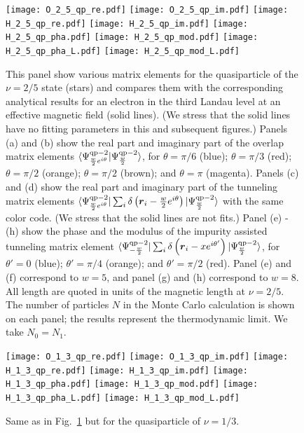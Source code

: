 \documentclass[twocolumn,floatfix,prb,aps,showpacs]{revtex4-2}
\renewcommand{\vec}[1]{\mbox{\boldmath$#1$}}
\begin{document}
\begin{figure}[t]
	\texttt{[image: O\_2\_5\_qp\_re.pdf]} 
	\texttt{[image: O\_2\_5\_qp\_im.pdf]} 
    \texttt{[image: H\_2\_5\_qp\_re.pdf]} 
	\texttt{[image: H\_2\_5\_qp\_im.pdf]} 
    \texttt{[image: H\_2\_5\_qp\_pha.pdf]} 
	\texttt{[image: H\_2\_5\_qp\_mod.pdf]} 
   \texttt{[image: H\_2\_5\_qp\_pha\_L.pdf]} 
	\texttt{[image: H\_2\_5\_qp\_mod\_L.pdf]} 
	\caption{This panel show various matrix elements for the quasiparticle of the 
	$\nu=2/5$ state (stars) and compares them with the corresponding analytical results for an electron in the third Landau level at an effective magnetic field (solid lines). (We stress that the solid lines have no fitting parameters in this and subsequent figures.) Panels (a) and (b) show the real part and imaginary part of the overlap matrix elements $\langle \Psi^{{\rm qp}-2}_{{w\over 2}e^{i\theta}}|\Psi^{{\rm qp}-2}_{w\over 2}\rangle$, for $\theta=\pi/6$ (blue); $\theta=\pi/3$ (red); $\theta=\pi/2$ (orange); $\theta=\pi/2$ (brown); and $\theta=\pi$ (magenta).  Panels (c) and (d) show the real part and imaginary part of the tunneling matrix elements $\langle \Psi^{{\rm qp}-2}_{{w\over 2}e^{i\theta}}|\sum_i \delta\left(\vec{r}_i-{w\over 2}e^{i\theta}\right)|\Psi^{{\rm qp}-2}_{w\over 2}\rangle$ with the same color code. (We stress that the solid lines are not fits.)  Panel (e) - (h) show the phase and the modulus of the impurity assisted tunneling matrix element $\langle\Psi^{{\rm qp}-2}_{-{w\over 2}}|\sum_i \delta\left(\vec{r}_i-xe^{i\theta'}\right)|\Psi^{{\rm qp}-2}_{w\over 2}\rangle$, for $\theta'=0$ (blue);  $\theta'=\pi/4$ (orange); and $\theta'=\pi/2$ (red). Panel (e) and (f) correspond to $w=5$, and panel (g) and (h) correspond to $w=8$. All length are quoted in units of the magnetic length at $\nu=2/5$. The number of particles $N$ in the Monte Carlo calculation is shown on each panel; the results represent the thermodynamic limit. We take $N_0=N_1$.
 }
	\label{O25}
\end{figure}

\begin{figure}[t]
	\texttt{[image: O\_1\_3\_qp\_re.pdf]} 
	\texttt{[image: O\_1\_3\_qp\_im.pdf]} 
    \texttt{[image: H\_1\_3\_qp\_re.pdf]} 
	\texttt{[image: H\_1\_3\_qp\_im.pdf]} 
    \texttt{[image: H\_1\_3\_qp\_pha.pdf]} 
	\texttt{[image: H\_1\_3\_qp\_mod.pdf]} 
   \texttt{[image: H\_1\_3\_qp\_pha\_L.pdf]} 
	\texttt{[image: H\_1\_3\_qp\_mod\_L.pdf]} 
	\caption{Same as in Fig.~\ref{O25} but for the quasiparticle of $\nu=1/3$.}
	\label{O13}
\end{figure}
 
\end{document}
